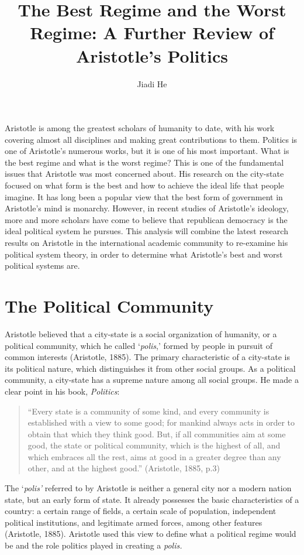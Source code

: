 \documentclass[11pt]{article}
\title{The Best Regime and the Worst Regime: A Further Review of Aristotle's Politics}
\author{Jiadi He}
\affil{Georgetown University}
\begin{document}
\maketitle
\keywordsline

Aristotle is among the greatest scholars of humanity to date, with his work covering almost all disciplines and making great contributions to them. Politics is one of Aristotle's numerous works, but it is one of his most important. What is the best regime and what is the worst regime? This is one of the fundamental issues that Aristotle was most concerned about. His research on the city-state focused on what form is the best and how to achieve the ideal life that people imagine. It has long been a popular view that the best form of government in Aristotle's mind is monarchy. However, in recent studies of Aristotle's ideology, more and more scholars have come to believe that republican democracy is the ideal political system he pursues. This analysis will combine the latest research results on Aristotle in the international academic community to re-examine his political system theory, in order to determine what Aristotle's best and worst political systems are.

\section{The Political Community}

Aristotle believed that a city-state is a social organization of humanity, or a political community, which he called ‘\textit{polis},’ formed by people in pursuit of common interests (Aristotle, 1885). The primary characteristic of a city-state is its political nature, which distinguishes it from other social groups. As a political community, a city-state has a supreme nature among all social groups. He made a clear point in his book, \textit{Politics}:

\begin{quote}
“Every state is a community of some kind, and every community is established with a view to some good; for mankind always acts in order to obtain that which they think good. But, if all communities aim at some good, the state or political community, which is the highest of all, and which embraces all the rest, aims at good in a greater degree than any other, and at the highest good.” (Aristotle, 1885, p.3)
\end{quote}

The ‘\textit{polis’} referred to by Aristotle is neither a general city nor a modern nation state, but an early form of state. It already possesses the basic characteristics of a country: a certain range of fields, a certain scale of population, independent political institutions, and legitimate armed forces, among other features (Aristotle, 1885). Aristotle used this view to define what a political regime would be and the role politics played in creating a \textit{polis.}
\end{document}
